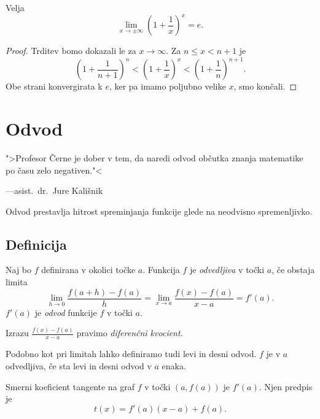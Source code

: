 \documentclass[12pt, a4paper]{article}
\begin{document}
\begin{trditev}
Velja
\[
\lim_{x\to\pm\infty}\left(1+\frac{1}{x}\right)^x=e.
\]
\end{trditev}

\begin{proof}
Trditev bomo dokazali le za $x\to\infty$. Za $n\leq x<n+1$ je
\[
\left(1+\frac{1}{n+1}\right)^n<\left(1+\frac{1}{x}\right)^x<\left(1+\frac{1}{n}\right)^{n+1}.
\]
Obe strani konvergirata k $e$, ker pa imamo poljubno velike $x$, smo končali.
\end{proof}

\newpage

\section{Odvod}

\epigraph{">Profesor Černe je dober v tem, da naredi odvod občutka znanja matematike po času zelo negativen."<}{---asist.~dr.~Jure Kališnik}

Odvod prestavlja hitrost spreminjanja funkcije glede na neodvisno spremenljivko.

\subsection{Definicija}

\begin{okvir}
\begin{definicija}
Naj bo $f$ definirana v okolici točke $a$. Funkcija $f$ je \emph{odvedljiva} v točki $a$, če obstaja limita
\[
\lim_{h\to 0}\frac{f(a+h)-f(a)}{h}=\lim_{x\to a}\frac{f(x)-f(a)}{x-a}=f'(a).
\]
$f'(a)$ je \emph{odvod} funkcije $f$ v točki $a$.
\end{definicija}
\end{okvir}

\begin{opomba}
Izrazu $\frac{f(x)-f(a)}{x-a}$ pravimo \emph{diferenčni kvocient}.
\end{opomba}

\begin{opomba}
Podobno kot pri limitah lahko definiramo tudi levi in desni odvod. $f$ je v $a$ odvedljiva, če sta levi in desni odvod v $a$ enaka.
\end{opomba}

\begin{trditev}
Smerni koeficient tangente na graf $f$ v točki $(a,f(a))$ je $f'(a)$. Njen predpis je
\[
t(x)=f'(a)(x-a)+f(a).
\]
\end{trditev}
\end{document}

